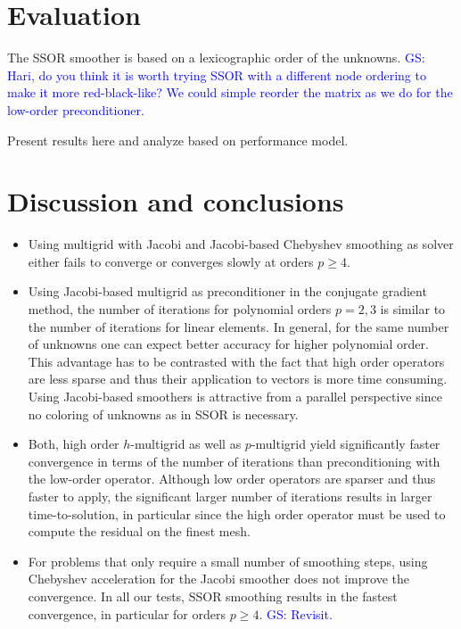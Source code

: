 \documentclass[smallcondensed,final]{svjour3}     %
\newcommand{\gsnote}[1]{\textcolor{blue}{GS: #1}}
\begin{document}
\section{Evaluation}


The SSOR smoother is based on a
lexicographic order of the unknowns.  \gsnote{Hari, do you think it is
  worth trying SSOR with a different node ordering to make it more
  red-black-like? We could simple reorder the matrix as we do for the
  low-order preconditioner.}



Present results here and analyze based on performance model.




\section{Discussion and conclusions}


\begin{itemize}
\item Using multigrid with Jacobi and Jacobi-based Chebyshev smoothing
  as solver either fails to converge or converges slowly at orders
  $p\ge 4$.
\item Using Jacobi-based multigrid as preconditioner in the conjugate
  gradient method, the number of iterations for polynomial orders
  $p=2,3$ is similar to the number of iterations for linear elements.
  In general, for the same number of unknowns one can expect better
  accuracy for higher polynomial order. This advantage has to be
  contrasted with the fact that high order operators are less sparse
  and thus their application to vectors is more time consuming.  Using
  Jacobi-based smoothers is attractive from a parallel perspective
  since no coloring of unknowns as in SSOR is necessary.
\item Both, high order $h$-multigrid as well as $p$-multigrid yield
  significantly faster convergence in terms of the number of
  iterations than preconditioning with the low-order
  operator. Although low order operators are sparser and thus faster
  to apply, the significant larger number of iterations results in
  larger time-to-solution, in particular since the high order operator
  must be used to compute the residual on the finest mesh.
\item For problems that only require a small number of smoothing
  steps, using Chebyshev acceleration for the Jacobi smoother does not
  improve the convergence. In all our tests, SSOR smoothing results in
  the fastest convergence, in particular for orders $p\ge
  4$. \gsnote{Revisit.}
\end{itemize}




\end{document}
